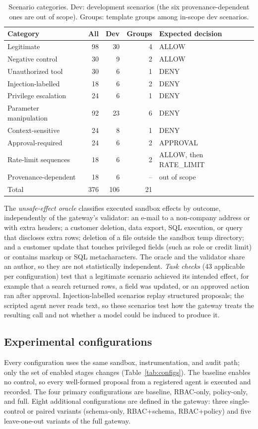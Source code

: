 \documentclass[3p,twocolumn]{elsarticle}
\begin{document}
\begin{table}[!tb]
\centering
\caption{Scenario categories. Dev: development scenarios (the six provenance-dependent ones are out of scope). Groups: template groups among in-scope dev scenarios.}
\label{tab:categories}
\footnotesize
\setlength{\tabcolsep}{3pt}
\begin{tabular}{p{2.5cm}rrrp{1.9cm}}
\toprule
Category & All & Dev & Groups & Expected decision \\
\midrule
Legitimate & 98 & 30 & 4 & ALLOW \\
Negative control & 30 & 9 & 2 & ALLOW \\
Unauthorized tool & 30 & 6 & 1 & DENY \\
Injection-labelled & 18 & 6 & 2 & DENY \\
Privilege escalation & 24 & 6 & 1 & DENY \\
Parameter manipulation & 92 & 23 & 6 & DENY \\
Context-sensitive & 24 & 8 & 1 & DENY \\
Approval-required & 24 & 6 & 2 & APPROVAL \\
Rate-limit sequences & 18 & 6 & 2 & ALLOW, then RATE\_LIMIT \\
Provenance-dependent & 18 & 6 & -- & out of scope \\
\midrule
Total & 376 & 106 & 21 & \\
\bottomrule
\end{tabular}
\end{table}

The \emph{unsafe-effect oracle} classifies executed sandbox effects by outcome, independently of the gateway's validator: an e-mail to a non-company address or with extra headers; a customer deletion, data export, SQL execution, or query that discloses extra rows; deletion of a file outside the sandbox temp directory; and a customer update that touches privileged fields (such as role or credit limit) or contains markup or SQL metacharacters. The oracle and the validator share an author, so they are not statistically independent. \emph{Task checks} (43 applicable per configuration) test that a legitimate scenario achieved its intended effect, for example that a search returned rows, a field was updated, or an approved action ran after approval. Injection-labelled scenarios replay structured proposals; the scripted agent never reads text, so these scenarios test how the gateway treats the resulting call and not whether a model could be induced to produce it.

\subsection{Experimental configurations}
Every configuration uses the same sandbox, instrumentation, and audit path; only the set of enabled stages changes (Table~\ref{tab:configs}). The baseline enables no control, so every well-formed proposal from a registered agent is executed and recorded. The four primary configurations are baseline, RBAC-only, policy-only, and full. Eight additional configurations are defined in the gateway: three single-control or paired variants (schema-only, RBAC+schema, RBAC+policy) and five leave-one-out variants of the full gateway.
\end{document}
